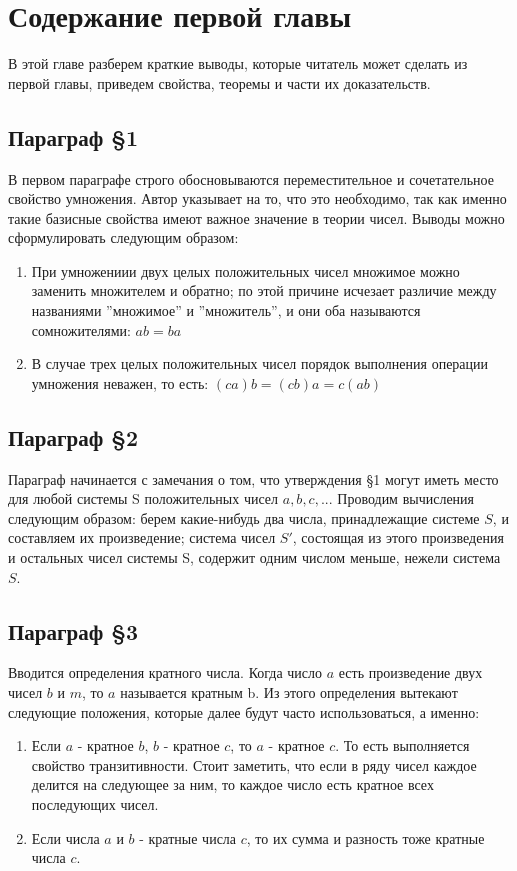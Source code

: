 \chapter{Содержание первой главы}

В этой главе разберем краткие выводы, которые читатель может сделать из первой главы, приведем свойства, теоремы и части их доказательств. 

\section{Параграф \S 1}
В первом параграфе строго обосновываются переместительное и сочетательное свойство умножения. Автор указывает на то, что это необходимо, так как именно такие базисные свойства имеют важное значение в теории чисел. Выводы можно сформулировать следующим образом:

\begin{enumerate}
    \item При умножениии двух целых положительных чисел множимое можно заменить множителем и обратно; по этой причине исчезает различие между названиями ”множимое” и ”множитель”, и они оба называются сомножителями: $ab = ba$
    \item В случае трех целых положительных чисел порядок выполнения операции умножения неважен, то есть: $(ca)b = (cb)a = c(ab)$
\end{enumerate} 

\section{Параграф \S 2}
Параграф начинается с замечания о том, что утверждения \S 1 могут иметь место для любой системы S положительных чисел $a, b, c, ...$
Проводим вычисления следующим образом: берем какие-нибудь два числа, принадлежащие системе $S$, и составляем их произведение; система чисел $S'$, состоящая из этого произведения и остальных чисел системы S, содержит одним числом меньше, нежели система $S$.

\section{Параграф \S 3}

Вводится определения кратного числа. Когда число $a$ есть произведение двух чисел $b$ и $m$, то $a$ называется кратным b. Из этого определения вытекают следующие положения, которые далее будут часто использоваться, а именно:

\begin{enumerate}
    \item Если $a$ - кратное $b$, $b$ - кратное $c$, то $a$ - кратное $c$. То есть выполняется свойство транзитивности. Стоит заметить, что если в ряду чисел каждое делится на следующее за ним, то каждое число есть кратное всех последующих чисел.
    \item Если числа $a$ и $b$ - кратные числа $c$, то их сумма и разность тоже кратные числа $c$.
\end{enumerate}

